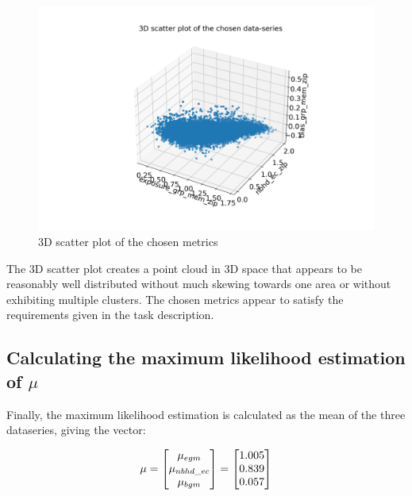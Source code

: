 \begin{figure}[H]
	\centering
	\includegraphics[width=0.9\linewidth]{images/3Dscatter.png}
	\caption{3D scatter plot of the chosen metrics}
	\label{fig:fig_3Dscatter}
\end{figure}


The 3D scatter plot creates a point cloud in 3D space that appears to be reasonably well distributed without much skewing towards one area or without exhibiting multiple clusters. The chosen metrics appear to satisfy the requirements given in the task description.

\subsection{Calculating the maximum likelihood estimation of $\mu$}
Finally, the maximum likelihood estimation is calculated as the mean of the three dataseries, giving the vector:

$$
\bf{\mu} = 
	\begin{bmatrix}
	\mu_{egm} \\
	\mu_{nbhd\_ec} \\
	\mu_{bgm} \\
	\end{bmatrix}  =
	\begin{bmatrix}
	1.005 \\
	0.839 \\
	0.057
\end{bmatrix}
$$




















